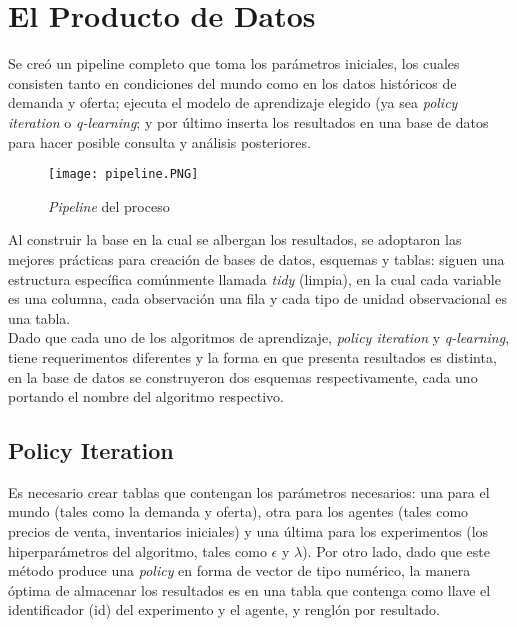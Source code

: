 \chapter{El Producto de Datos}

Se cre\'o un pipeline completo que toma los par\'ametros iniciales, los cuales consisten tanto en condiciones del mundo como en los datos hist\'oricos de demanda y oferta; ejecuta el modelo de aprendizaje elegido (ya sea \textit{policy iteration} o \textit{q-learning}; y por \'ultimo inserta los resultados en una base de datos para hacer posible consulta y an\'alisis posteriores.\\

\begin{figure}[ht]
\caption{\textit{Pipeline} del proceso}
\label{pipeline}
\texttt{[image: pipeline.PNG]}
\centering
\end{figure}

Al construir la base en la cual se albergan los resultados, se adoptaron las mejores pr\'acticas para creaci\'on de bases de datos, esquemas y tablas: siguen una estructura espec\'ifica com\'unmente llamada \textit{tidy} (limpia), en la cual cada variable es una columna, cada observaci\'on una fila y cada tipo de unidad observacional es una tabla.\\

Dado que cada uno de los algoritmos de aprendizaje, \textit{policy iteration} y \textit{q-learning}, tiene requerimentos diferentes y la forma en que presenta resultados es distinta, en la base de datos se construyeron dos esquemas respectivamente, cada uno portando el nombre del algoritmo respectivo.

\section{Policy Iteration}

Es necesario crear tablas que contengan los par\'ametros necesarios: una para el mundo (tales como la demanda y oferta), otra para los agentes (tales como precios de venta, inventarios iniciales) y una \'ultima para los experimentos (los hiperpar\'ametros del algoritmo, tales como $\epsilon$ y $\lambda$). Por otro lado, dado que este m\'etodo produce una \textit{policy} en forma de vector de tipo num\'erico, la manera \'optima de almacenar los resultados es en una tabla que contenga como llave el identificador (id) del experimento y el agente, y rengl\'on por resultado.\\ 

